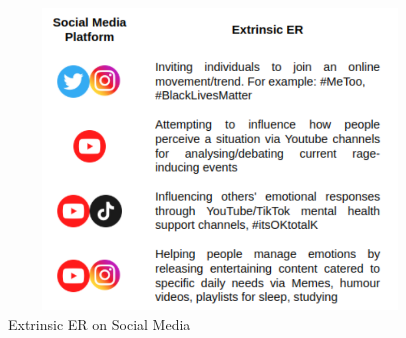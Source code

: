 \documentclass[lettersize,journal]{IEEEtran}
\begin{document}
\begin{figure}[h]
  
    \centering
    \includegraphics[width=12cm,height=8cm,keepaspectratio]{ExtrinsicSM.pdf}
  \caption{Extrinsic ER on Social Media}
  \label{fig:ExtrinsicSM}
  \end{figure}
\end{document}
